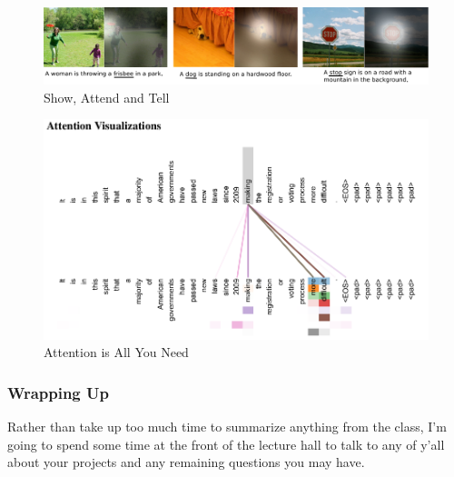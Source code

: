 \documentclass{article}
\begin{document}
\begin{figure}[h]
    \centering
    \includegraphics[width=1.0\textwidth]{figs/show-attend-tell.png}
    \caption{Show, Attend and Tell}
    \label{fig:show_attend}
\end{figure}

\begin{figure}[h]
    \centering
    \includegraphics[width=1.0\textwidth]{figs/aaln.png}
    \caption{Attention is All You Need}
    \label{fig:attention_need}
\end{figure}





\subsubsection{Wrapping Up}

Rather than take up too much time to summarize anything from the class, I'm going to spend some time at the front of the lecture hall to talk to any of y'all about your projects and any remaining questions you may have.
\end{document}
